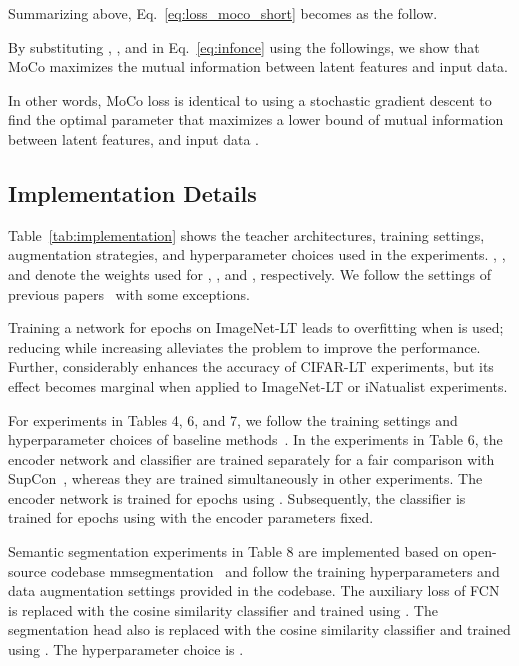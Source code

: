 \documentclass{article}
\theoremstyle{plain}
\theoremstyle{definition}
\theoremstyle{remark}
\begin{document}
Summarizing above, Eq.~\ref{eq:loss_moco_short} becomes as the follow.


By substituting , , and  in Eq.~\ref{eq:infonce} using the followings, we show that MoCo maximizes the mutual information between latent features and input data.


In other words, MoCo loss is identical to using a stochastic gradient descent to find the optimal parameter  that maximizes a lower bound of mutual information between latent features,  and input data .





\subsection{Implementation Details}
\label{sec:more_implementation_details}

Table~\ref{tab:implementation} shows the teacher architectures, training settings, augmentation strategies, and hyperparameter choices used in the experiments. , , and  denote the weights used for , , and , respectively. We follow the settings of previous papers~\cite{cui2021parametric,zhu2022balanced} with some exceptions.

Training a network for  epochs on ImageNet-LT leads to overfitting when  is used; reducing  while increasing  alleviates the problem to improve the performance. Further,  considerably enhances the accuracy of CIFAR-LT experiments, but its effect becomes marginal when applied to ImageNet-LT or iNatualist experiments.

For experiments in Tables 4, 6, and 7, we follow the training settings and hyperparameter choices of baseline methods~\cite{khosla2020supervised,tian2020contrastive,tian2021vl}. In the experiments in Table 6, the encoder network and classifier are trained separately for a fair comparison with SupCon~\cite{khosla2020supervised}, whereas they are trained simultaneously in other experiments. The encoder network is trained for  epochs using . Subsequently, the classifier is trained for  epochs using  with the encoder parameters fixed.

Semantic segmentation experiments in Table 8 are implemented based on open-source codebase mmsegmentation~\cite{mmseg2020} and follow the training hyperparameters and data augmentation settings provided in the codebase. The auxiliary loss of FCN~\cite{long2015fully} is replaced with the cosine similarity classifier and trained using . The segmentation head also is replaced with the cosine similarity classifier and trained using . The hyperparameter choice is .
\end{document}
